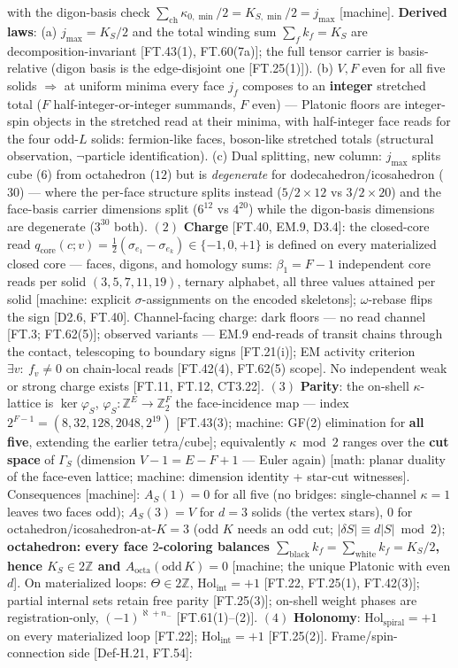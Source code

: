 \begin{theorem}
with the digon-basis check $\sum_{\mathrm{ch}}\kappa_{0,\min}/2=K_{S,\min}/2=j_{\max}$ [machine]. \textbf{Derived laws}: (a) $j_{\max}=K_S/2$ and the total winding sum $\sum_fk_f=K_S$ are decomposition-invariant [FT.43(1), FT.60(7a)]; the full tensor carrier is basis-relative (digon basis is the edge-disjoint one [FT.25(1)]). (b) $V,F$ even for all five solids $\Rightarrow$ at uniform minima every face $j_f$ composes to an \textbf{integer} stretched total ($F$ half-integer-or-integer summands, $F$ even) — Platonic floors are integer-spin objects in the stretched read at their minima, with half-integer face reads for the four odd-$L$ solids: fermion-like faces, boson-like stretched totals (structural observation, $\neg$particle identification). (c) Dual splitting, new column: $j_{\max}$ splits cube ($6$) from octahedron ($12$) but is \textit{degenerate} for dodecahedron/icosahedron ($30$) — where the per-face structure splits instead ($5/2\times12$ vs $3/2\times20$) and the face-basis carrier dimensions split ($6^{12}$ vs $4^{20}$) while the digon-basis dimensions are degenerate ($3^{30}$ both). $(2)$ \textbf{Charge} [FT.40, EM.9, D3.4]: the closed-core read $q_{\mathrm{core}}(c;v)=\tfrac12(\sigma_{e_1}-\sigma_{e_k})\in\{-1,0,+1\}$ is defined on every materialized closed core — faces, digons, and homology sums: $\beta_1=F-1$ independent core reads per solid $(3,5,7,11,19)$, ternary alphabet, all three values attained per solid [machine: explicit $\sigma$-assignments on the encoded skeletons]; $\omega$-rebase flips the sign [D2.6, FT.40]. Channel-facing charge: dark floors — no read channel [FT.3; FT.62(5)]; observed variants — EM.9 end-reads of transit chains through the contact, telescoping to boundary signs [FT.21(i)]; EM activity criterion $\exists v:\ f_v\ne0$ on chain-local reads [FT.42(4), FT.62(5) scope]. No independent weak or strong charge exists [FT.11, FT.12, CT3.22]. $(3)$ \textbf{Parity}: the on-shell $\kappa$-lattice is $\ker\varphi_S$, $\varphi_S:\mathbb Z^E\to\mathbb Z_2^F$ the face-incidence map — index $2^{F-1}=(8,32,128,2048,2^{19})$ [FT.43(3); machine: GF(2) elimination for \textbf{all five}, extending the earlier tetra/cube]; equivalently $\kappa\bmod2$ ranges over the \textbf{cut space} of $\Gamma_S$ (dimension $V-1=E-F+1$ — Euler again) [math: planar duality of the face-even lattice; machine: dimension identity + star-cut witnesses]. Consequences [machine]: $A_S(1)=0$ for all five (no bridges: single-channel $\kappa{=}1$ leaves two faces odd); $A_S(3)=V$ for $d{=}3$ solids (the vertex stars), $0$ for octahedron/icosahedron-at-$K{=}3$ (odd $K$ needs an odd cut; $|\delta S|\equiv d|S|\bmod2$); \textbf{octahedron: every face $2$-coloring balances $\sum_{\mathrm{black}}k_f=\sum_{\mathrm{white}}k_f=K_S/2$, hence $K_S\in2\mathbb Z$ and $A_{\mathrm{octa}}(\text{odd}\,K)=0$} [machine; the unique Platonic with even $d$]. On materialized loops: $\Theta\in2\mathbb Z$, $\mathrm{Hol}_{\mathrm{int}}=+1$ [FT.22, FT.25(1), FT.42(3)]; partial internal sets retain free parity [FT.25(3)]; on-shell weight phases are registration-only, $(-1)^{\aleph+n_-}$ [FT.61(1)–(2)]. $(4)$ \textbf{Holonomy}: $\mathrm{Hol}_{\mathrm{spiral}}=+1$ on every materialized loop [FT.22]; $\mathrm{Hol}_{\mathrm{int}}=+1$ [FT.25(2)]. Frame/spin-connection side [Def-H.21, FT.54]: 
\end{theorem}
